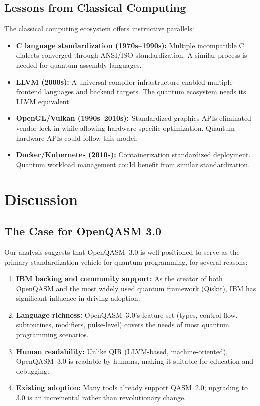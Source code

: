\documentclass[journal]{IEEEtran}
\begin{document}
\subsection{Lessons from Classical Computing}

The classical computing ecosystem offers instructive parallels:

\begin{itemize}
    \item \textbf{C language standardization (1970s--1990s):} Multiple incompatible C dialects converged through ANSI/ISO standardization. A similar process is needed for quantum assembly languages.
    \item \textbf{LLVM (2000s):} A universal compiler infrastructure enabled multiple frontend languages and backend targets. The quantum ecosystem needs its LLVM equivalent.
    \item \textbf{OpenGL/Vulkan (1990s--2010s):} Standardized graphics APIs eliminated vendor lock-in while allowing hardware-specific optimization. Quantum hardware APIs could follow this model.
    \item \textbf{Docker/Kubernetes (2010s):} Containerization standardized deployment. Quantum workload management could benefit from similar standardization.
\end{itemize}

\section{Discussion}
\label{sec:discussion}

\subsection{The Case for OpenQASM 3.0}

Our analysis suggests that OpenQASM~3.0 is well-positioned to serve as the primary standardization vehicle for quantum programming, for several reasons:

\begin{enumerate}
    \item \textbf{IBM backing and community support:} As the creator of both OpenQASM and the most widely used quantum framework (Qiskit), IBM has significant influence in driving adoption.
    \item \textbf{Language richness:} OpenQASM~3.0's feature set (types, control flow, subroutines, modifiers, pulse-level) covers the needs of most quantum programming scenarios.
    \item \textbf{Human readability:} Unlike QIR (LLVM-based, machine-oriented), OpenQASM~3.0 is readable by humans, making it suitable for education and debugging.
    \item \textbf{Existing adoption:} Many tools already support QASM~2.0; upgrading to 3.0 is an incremental rather than revolutionary change.
\end{enumerate}
\end{document}
